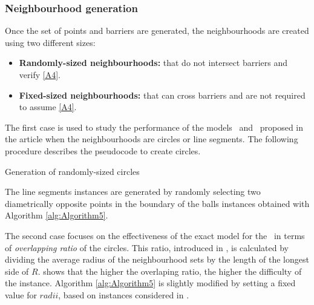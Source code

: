 \documentclass[a4paper,  review, authoryear, 1p., doubleblind]{elsarticle}
\newcommand{\TSPHN}{{\sf{H-TSPHN}\xspace }}
\newcommand{\TSPN}{{\sf{H-TSPN}\xspace }}
\begin{document}
\subsubsection*{Neighbourhood generation}
Once the set of points and barriers are generated, the neighbourhoods are created using two different sizes:
\begin{itemize}
	\item \textbf{Randomly-sized neighbourhoods:} that do not intersect barriers and verify \ref{A4}. 
	\item \textbf{Fixed-sized neighbourhoods:} that can cross barriers and are not required to assume \ref{A4}. 
\end{itemize}
The first case is used to study the performance of the models \TSPHN \ and \TSPN \ proposed in the article when the neighbourhoods are circles or line segments. The following procedure describes the pseudocode to create circles.

\begin{algorithm}[H]
	\caption{Generation of randomly-sized circles}
	\label{alg:Algorithm5}
	
\end{algorithm}

The line segments instances are generated by randomly selecting two diametrically opposite points in the boundary of the balls instances obtained with Algorithm \ref{alg:Algorithm5}.


The second case focuses on the effectiveness of the exact model for the \TSPN \ in terms of \emph{overlapping ratio} of the circles. This ratio, introduced in \cite{mennell_heuristics_2009}, is calculated by dividing the average radius of the neighbourhood sets by the length of the longest side of $R$. \cite{mennell_heuristics_2009} shows that the higher the overlaping ratio, the higher the difficulty of the instance. Algorithm \ref{alg:Algorithm5} is slightly modified by setting a fixed value for $radii$, based on instances considered in \cite{behdani_integer-programming-based_2014}.
\end{document}
